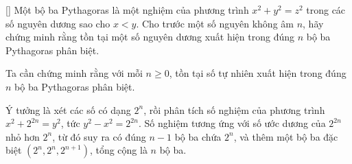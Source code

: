 \documentclass[../09-contruction-methods.tex]{subfiles}
\begin{document}
\begin{example*}\label{example:ROU-2015-TST-D1-P3}[\textbf{}]
    Một bộ ba Pythagoras là một nghiệm của phương trình \( x^2 + y^2 = z^2 \) trong các số nguyên dương sao cho \( x < y \).
    Cho trước một số nguyên không âm \( n \), hãy chứng minh rằng tồn tại một số nguyên dương xuất hiện trong đúng \( n \) bộ ba Pythagoras phân biệt.
\end{example*}

\begin{story*}
    Ta cần chứng minh rằng với mỗi \( n \ge 0 \), tồn tại số tự nhiên xuất hiện trong đúng \( n \) bộ ba Pythagoras phân biệt.

    Ý tưởng là xét các số có dạng \( 2^n \), rồi phân tích số nghiệm của phương trình \( x^2 + 2^{2n} = y^2 \),
    tức \( y^2 - x^2 = 2^{2n} \). Số nghiệm tương ứng với số ước dương của \( 2^{2n} \) nhỏ hơn \( 2^n \),
    từ đó suy ra có đúng \( n - 1 \) bộ ba chứa \( 2^n \), và thêm một bộ ba đặc biệt \( (2^n, 2^n, 2^{n+1}) \),
    tổng cộng là \( n \) bộ ba.
\end{story*}
\end{document}

